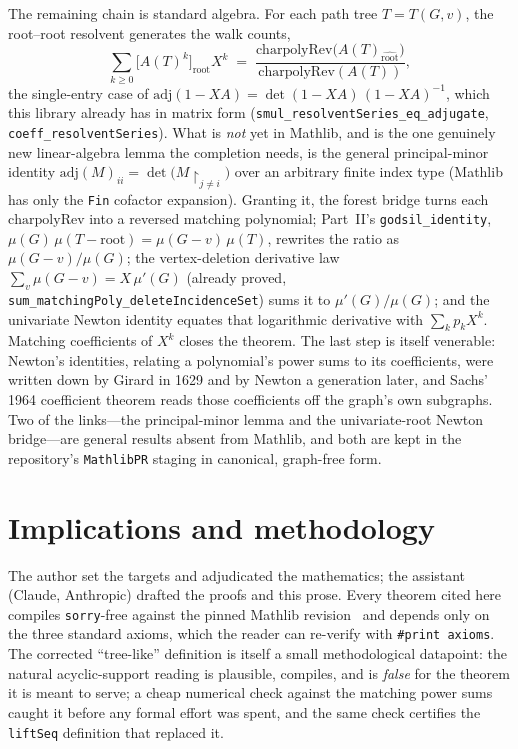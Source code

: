 \documentclass[11pt]{article}
\newcommand{\lean}[1]{\texttt{#1}}
\begin{document}
The remaining chain is standard algebra. For each path tree $T=T(G,v)$, the root--root resolvent
generates the walk counts,
\[
  \sum_{k\ge0}\bigl[A(T)^k\bigr]_{\mathrm{root}}X^{k}
  \;=\;\frac{\mathrm{charpolyRev}\bigl(A(T)_{\widehat{\mathrm{root}}}\bigr)}{\mathrm{charpolyRev}(A(T))},
\]
the single-entry case of $\mathrm{adj}(1-XA)=\det(1-XA)\,(1-XA)^{-1}$, which this library already has
in matrix form (\lean{smul\_resolventSeries\_eq\_adjugate}, \lean{coeff\_resolventSeries}). What is
\emph{not} yet in Mathlib, and is the one genuinely new linear-algebra lemma the completion needs, is
the general principal-minor identity $\mathrm{adj}(M)_{ii}=\det\bigl(M\!\restriction_{j\neq i}\bigr)$
over an arbitrary finite index type (Mathlib has only the \lean{Fin} cofactor expansion). Granting it,
the forest bridge turns each $\mathrm{charpolyRev}$ into a reversed matching polynomial; Part~II's
\lean{godsil\_identity}, $\mu(G)\,\mu(T-\mathrm{root})=\mu(G-v)\,\mu(T)$, rewrites the ratio as
$\mu(G-v)/\mu(G)$; the vertex-deletion derivative law $\sum_v\mu(G-v)=X\,\mu'(G)$ (already proved,
\lean{sum\_matchingPoly\_deleteIncidenceSet}) sums it to $\mu'(G)/\mu(G)$; and the univariate Newton
identity equates that logarithmic derivative with $\sum_k p_k X^{k}$. Matching coefficients of $X^k$
closes the theorem. The last step is itself venerable: Newton's identities, relating a polynomial's
power sums to its coefficients, were written down by Girard in 1629 and by Newton a generation later,
and Sachs' 1964 coefficient theorem reads those coefficients off the graph's own subgraphs. Two of the
links---the principal-minor lemma and the univariate-root Newton bridge---are general results absent
from Mathlib, and both are kept in the repository's \texttt{MathlibPR} staging in canonical, graph-free
form.

\section{Implications and methodology}
\label{sec:implications}

The author set the targets and adjudicated the mathematics; the assistant (Claude, Anthropic) drafted
the proofs and this prose. Every theorem cited here compiles \lean{sorry}-free against the pinned
Mathlib revision~\cite{Mathlib} and depends only on the three standard axioms, which the reader can
re-verify with \lean{\#print axioms}. The corrected ``tree-like'' definition is itself a small
methodological datapoint: the natural acyclic-support reading is plausible, compiles, and is
\emph{false} for the theorem it is meant to serve; a cheap numerical check against the matching power
sums caught it before any formal effort was spent, and the same check certifies the
\lean{liftSeq} definition that replaced it.
\end{document}
